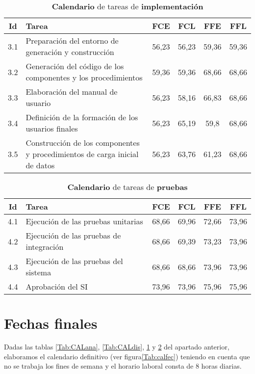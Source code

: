 \documentclass[11pt,a4paper,spanish,twoside]{report}
\begin{document}
\begin{table}[!h]
  \centering
  \begin{tabular}{|c||p{5.3cm}||c|c|c|c|}
    \hline
    \textbf{Id} & \textbf{Tarea} & \textbf{FCE} & \textbf{FCL} &
    \textbf{FFE} & \textbf{FFL}\\
    \hline \hline
    3.1 & Preparación del entorno de generación y construcción & 56,23 &
    56,23 & 59,36 & 59,36\\ 
    \hline
    3.2 & Generación del código de los componentes y los procedimientos
    &59,36 & 59,36 & 68,66 & 68,66\\ 
    \hline
    3.3 & Elaboración del manual de usuario & 56,23 & 58,16 & 66,83 & 68,66\\
    \hline
    3.4 & Definición de la formación de los usuarios finales & 56,23 &
    65,19 & 59,8 & 68,66\\ 
    \hline
    3.5 & Construcción de los componentes y procedimientos de carga inicial
    de datos & 56,23 & 63,76 & 61,23 & 68,66\\
    \hline
  \end{tabular}
  \caption{\textbf{Calendario} de tareas de \textbf{implementación}}
  \label{Tab:CALimp}
\end{table}
    
\begin{table}[!h]
  \centering
  \begin{tabular}{|c||p{5.3cm}||c|c|c|c|}
    \hline
    \textbf{Id} & \textbf{Tarea} & \textbf{FCE} & \textbf{FCL} &
    \textbf{FFE} & \textbf{FFL}\\
    \hline \hline
    4.1 & Ejecución de las pruebas unitarias & 68,66 & 69,96 & 72,66 & 73,96\\
    \hline
    4.2 & Ejecución de las pruebas de integración & 68,66 & 69,39 & 73,23 &
    73,96\\ 
    \hline
    4.3 & Ejecución de las pruebas del sistema & 68,66 & 68,66 & 73,96 &
    73,96 \\ 
    \hline
    4.4 & Aprobación del SI & 73,96 & 73,96 & 75,96 & 75,96\\
    \hline
  \end{tabular}
  \caption{\textbf{Calendario} de tareas de \textbf{pruebas}}
  \label{Tab:CALpru}
\end{table}


\section{Fechas finales}
Dadas las tablas \ref{Tab:CALana}, \ref{Tab:CALdis}, \ref{Tab:CALimp} y
\ref{Tab:CALpru} del apartado anterior, elaboramos el calendario definitivo
(ver figura\ref{Tab:calfec}) teniendo en cuenta que no se trabaja los fines
de semana y el horario laboral consta de 8 horas diarias.
 
\end{document}
